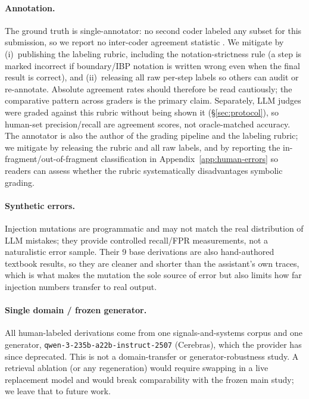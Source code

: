\paragraph{Annotation.} The ground truth is single-annotator: no second coder
labeled any subset for this submission, so we report no inter-coder agreement
statistic \citep{artstein2008agreement}. We mitigate by (i)~publishing the
labeling rubric, including the notation-strictness rule (a step is marked
incorrect if boundary/IBP notation is written wrong even when the final result is
correct), and (ii)~releasing all raw per-step labels so others can audit or
re-annotate. Absolute agreement rates should therefore be read cautiously; the
comparative pattern across graders is the primary claim. Separately, LLM judges
were graded against this rubric without being shown it (\S\ref{sec:protocol}), so
human-set precision/recall are agreement scores, not oracle-matched accuracy. The
annotator is also the author of the grading pipeline and the labeling rubric; we
mitigate by releasing the rubric and all raw labels, and by reporting the
in-fragment/out-of-fragment classification in Appendix~\ref{app:human-errors} so
readers can assess whether the rubric systematically disadvantages symbolic
grading.

\paragraph{Synthetic errors.} Injection mutations are programmatic and may not
match the real distribution of LLM mistakes; they provide controlled recall/FPR
measurements, not a naturalistic error sample. Their 9 base derivations are also
hand-authored textbook results, so they are cleaner and shorter than the
assistant's own traces, which is what makes the mutation the sole source of
error but also limits how far injection numbers transfer to real output.

\paragraph{Single domain / frozen generator.} All human-labeled derivations come
from one signals-and-systems corpus and one generator,
\texttt{qwen-3-235b-a22b-instruct-2507} (Cerebras), which the provider has since
deprecated. This is not a domain-transfer or generator-robustness study. A
retrieval ablation (or any regeneration) would require swapping in a live
replacement model and would break comparability with the frozen main study; we
leave that to future work.
